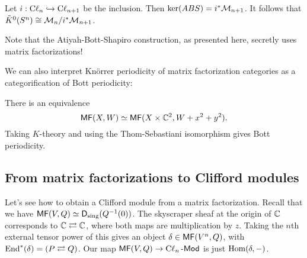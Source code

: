 \documentclass{article}
\begin{document}
\begin{thm}
	Let $i: \operatorname{C\ell}_n \hookrightarrow \operatorname{C\ell}_{n+1}$ be the inclusion.
	Then $\ker(\mathop{ABS}) = i^* \mathcal{M}_{n+1}$.
	It follows that $\tilde{K}^0(S^n) \cong \mathcal{M}_n / i^* \mathcal{M}_{n+1}$.
\end{thm}

Note that the Atiyah-Bott-Shapiro construction, as presented here, secretly uses matrix factorizations!

We can also interpret Kn\"orrer periodicity of matrix factorization categories as a categorification of Bott periodicity:

\begin{thm}
	There is an equivalence
	\[
		\mathsf{MF}(X, W) \simeq \mathsf{MF}(X \times \mathbb{C}^2, W + x^2 + y^2).
	\]
	Taking $K$-theory and using the Thom-Sebastiani isomorphism gives Bott periodicity.
\end{thm}

\subsection{From matrix factorizations to Clifford modules}

Let's see how to obtain a Clifford module from a matrix factorization.
Recall that we have $\mathsf{MF}(V, Q) \simeq \mathsf{D}_{\mathrm{sing}}(Q^{-1}(0))$.
The skyscraper sheaf at the origin of $\mathbb{C}$ corresponds to $\mathbb{C} \rightleftarrows \mathbb{C}$, where both maps are multiplication by $z$.
Taking the $n$th external tensor power of this gives an object $\delta \in \mathsf{MF}(V^n, Q)$, with $\operatorname{End}^*(\delta) = (P \rightleftarrows Q)$.
Our map $\mathsf{MF}(V, Q) \to \operatorname{C\ell}_n\text{-}\mathsf{Mod}$ is just $\operatorname{Hom}(\delta, -)$.
\end{document}
